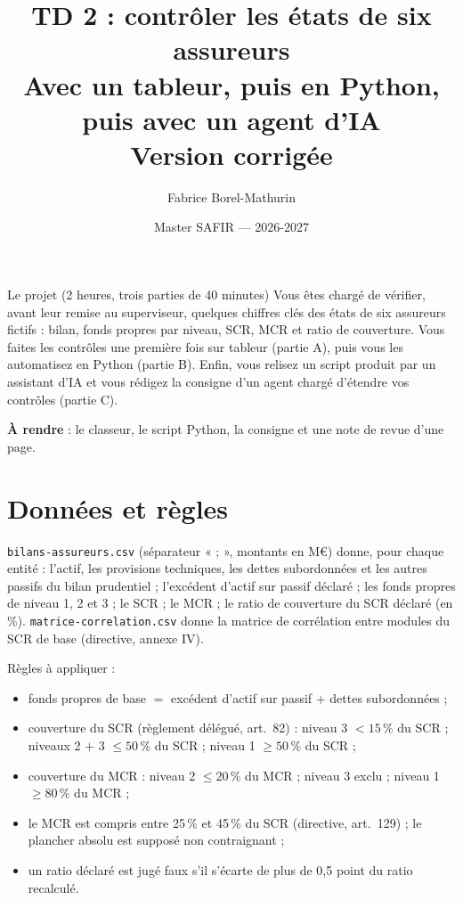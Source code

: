\documentclass[11pt,a4paper]{article}
\title{\vspace{-1.5cm}\sffamily\bfseries\color{bleuactu}
       TD 2 : contrôler les états de six assureurs\\[2mm]
       \large\mdseries\color{black}Avec un tableur, puis en Python, puis avec un agent d'IA
       \ifcorrection\\[1mm]\color{vertactu}Version corrigée\fi}
\author{\sffamily Fabrice Borel-Mathurin}
\date{\sffamily\small Master SAFIR --- 2026-2027}
\begin{document}
\maketitle
\thispagestyle{empty}

\begin{notion}{Le projet (2 heures, trois parties de 40 minutes)}
Vous êtes chargé de vérifier, avant leur remise au superviseur, quelques chiffres clés des états
de six assureurs fictifs : bilan, fonds propres par niveau, SCR, MCR et ratio de couverture.
Vous faites les contrôles une première fois sur tableur (partie A), puis vous les automatisez en
Python (partie B). Enfin, vous relisez un script produit par un assistant d'IA et vous rédigez la
consigne d'un agent chargé d'étendre vos contrôles (partie C).

\smallskip
\textbf{À rendre} : le classeur, le script Python, la consigne et une note de revue d'une page.
\end{notion}

\section{Données et règles}

\texttt{bilans-assureurs.csv} (séparateur « ; », montants en M\euro) donne, pour chaque entité :
l'actif, les provisions techniques, les dettes subordonnées et les autres passifs du bilan
prudentiel ; l'excédent d'actif sur passif déclaré ; les fonds propres de niveau 1, 2 et 3 ; le
SCR ; le MCR ; le ratio de couverture du SCR déclaré (en \%). \texttt{matrice-correlation.csv}
donne la matrice de corrélation entre modules du SCR de base (directive, annexe IV).

\smallskip
\noindent Règles à appliquer :
\begin{itemize}[nosep]
  \item fonds propres de base $=$ excédent d'actif sur passif $+$ dettes subordonnées ;
  \item couverture du SCR (règlement délégué, art.~82) : niveau 3 $< 15\,\%$ du SCR ; niveaux 2 $+$ 3
        $\leq 50\,\%$ du SCR ; niveau 1 $\geq 50\,\%$ du SCR ;
  \item couverture du MCR : niveau 2 $\leq 20\,\%$ du MCR ; niveau 3 exclu ; niveau 1 $\geq 80\,\%$ du MCR ;
  \item le MCR est compris entre 25\,\% et 45\,\% du SCR (directive, art.~129) ; le plancher absolu
        est supposé non contraignant ;
  \item un ratio déclaré est jugé faux s'il s'écarte de plus de 0,5 point du ratio recalculé.
\end{itemize}
\end{document}
